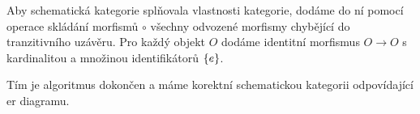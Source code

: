 Aby schematická kategorie splňovala vlastnosti kategorie, dodáme do ní pomocí operace skládání morfismů $\circ$ všechny odvozené morfismy chybějící do tranzitivního uzávěru.
Pro každý objekt $O$ dodáme identitní morfismus $O\to O$ s kardinalitou \oneone{} a množinou identifikátorů $\left\{e\right\}$.

Tím je algoritmus dokončen a máme korektní schematickou kategorii odpovídající \acrshort{er} diagramu.

